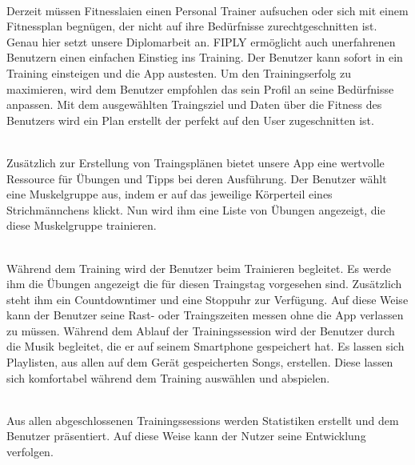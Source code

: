 \documentclass[FIPLY_base.tex]{subfiles}
\begin{document}
\ \\
Derzeit müssen Fitnesslaien einen Personal Trainer aufsuchen oder sich mit einem Fitnessplan begnügen, der nicht auf ihre Bedürfnisse zurechtgeschnitten ist. Genau hier setzt unsere Diplomarbeit an. FIPLY ermöglicht auch unerfahrenen Benutzern einen einfachen Einstieg ins Training. Der Benutzer kann sofort in ein Training einsteigen und die App austesten.
Um den Trainingserfolg zu maximieren, wird dem Benutzer empfohlen das sein Profil an seine Bedürfnisse anpassen.
Mit dem ausgewählten Traingsziel und Daten über die Fitness des Benutzers wird ein Plan erstellt der perfekt auf den User zugeschnitten ist.

\ \\
Zusätzlich zur Erstellung von Traingsplänen bietet unsere App eine wertvolle Ressource für Übungen und Tipps bei deren Ausführung. Der Benutzer wählt eine Muskelgruppe aus, indem er auf das jeweilige Körperteil eines Strichmännchens klickt. Nun wird ihm eine Liste von Übungen angezeigt, die diese Muskelgruppe trainieren.

\ \\
Während dem Training wird der Benutzer beim Trainieren begleitet. Es werde ihm die Übungen angezeigt die für diesen Traingstag vorgesehen sind. Zusätzlich steht ihm ein Countdowntimer und eine Stoppuhr zur Verfügung. Auf diese Weise kann der Benutzer seine Rast- oder Traingszeiten messen ohne die App verlassen zu müssen.  
Während dem Ablauf der Trainingssession wird der Benutzer durch die Musik begleitet, die er auf seinem Smartphone gespeichert hat.
Es lassen sich Playlisten, aus allen auf dem Gerät gespeicherten Songs, erstellen. Diese lassen sich komfortabel während dem Training auswählen und abspielen.

\ \\
Aus allen abgeschlossenen Trainingssessions werden Statistiken erstellt und dem Benutzer präsentiert.
Auf diese Weise kann der Nutzer seine Entwicklung verfolgen. 
\end{document}
